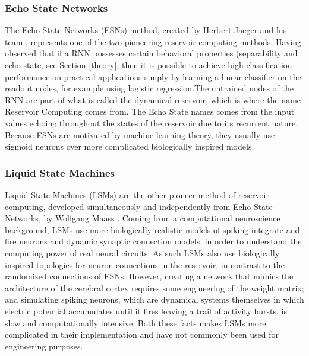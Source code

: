 \documentclass[12pt,oneside]{CUNY_CS_PhD}
\begin{document}
\subsubsection{Echo State Networks}
The Echo State Networks (ESNs) method, created by Herbert Jaeger and his team \cite{jaeger_echo_2001}, represents one of the two pioneering reservoir computing methods. Having observed that if a RNN possesses certain behavioral properties (separability and echo state, see Section \ref{theory},
 then it is possible to achieve high classification performance on practical applications simply by learning a linear classifier on the readout nodes, for example using logistic regression.The untrained nodes of the RNN are part of what is called the dynamical reservoir, which is where the name Reservoir Computing comes from. The Echo State names comes from the input values echoing throughout the states of the reservoir due to its recurrent nature. Because ESNs are motivated by machine learning theory, they usually use sigmoid neurons over more complicated biologically inspired models.

\subsubsection{Liquid State Machines}
Liquid State Machines (LSMs) are the other pioneer method of reservoir computing, developed simultaneously and independently from Echo State Networks, by Wolfgang Maass \cite{Natschlager2002}. Coming from a computational neuroscience background, LSMs use more biologically realistic models of spiking integrate-and-fire neurons and dynamic synaptic connection models,
 in order to understand the computing power of real neural circuits. As such LSMs also use biologically inspired topologies for neuron connections in the reservoir, in contrast to the randomized connections of ESNs. However, creating a network that mimics the architecture of the cerebral cortex requires some engineering of the weight matrix; and simulating spiking neurons, which are dynamical systems themselves in which electric potential accumulates until it fires leaving a trail of activity bursts, is slow and computationally intensive. Both these facts makes LSMs more complicated in their implementation and have not commonly been used for engineering purposes.
\end{document}
